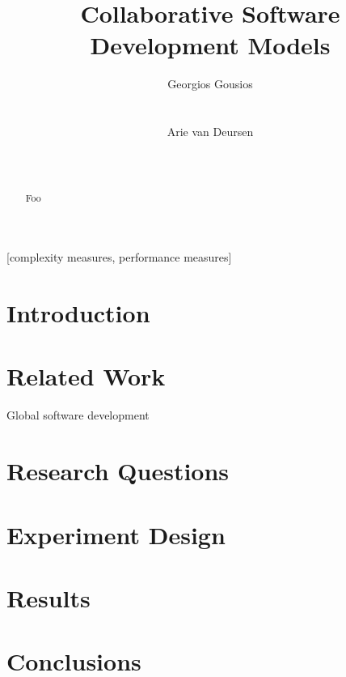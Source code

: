 \documentclass{sig-alternate}
\begin{document}

\title{Collaborative Software Development Models}

\author{
\alignauthor
Georgios Gousios\\
       \\
       \\
\alignauthor
Arie van Deursen\\
       \\
       \\
}

\maketitle

\begin{abstract}
Foo
\end{abstract}

[complexity measures, performance measures]

\section{Introduction}

\section{Related Work}

Global software development



\section{Research Questions}


\section{Experiment Design}

\section{Results}

\section{Conclusions}
\end{document}
